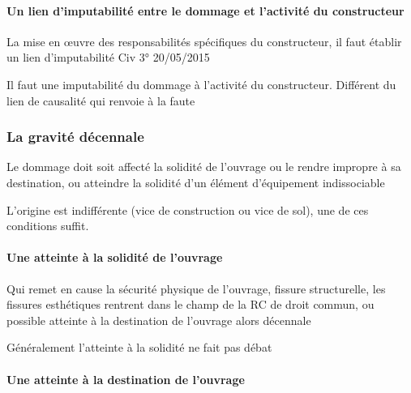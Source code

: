 			\paragraph{Un lien d'imputabilité entre le dommage et l'activité du constructeur}

			La mise en œuvre des responsabilités spécifiques du constructeur, il faut établir un lien d’imputabilité Civ 3°  20/05/2015

			Il faut une imputabilité du dommage à l’activité du constructeur. Différent du lien de causalité qui renvoie à la faute


		\subsubsection{La gravité décennale}\label{graviteDecennale}

		Le dommage doit soit affecté la solidité de l’ouvrage ou le rendre impropre à sa destination, ou atteindre la solidité d’un élément d’équipement indissociable

		L’origine est indifférente (vice de construction ou vice de sol), une de ces conditions suffit.


			\paragraph{Une atteinte à la solidité de l'ouvrage}

			Qui remet en cause la sécurité physique de l’ouvrage, fissure structurelle, les fissures esthétiques rentrent dans le champ de la RC de droit commun, ou possible atteinte à la destination de l’ouvrage alors décennale

			Généralement l’atteinte à la solidité ne fait pas débat


			\paragraph{Une atteinte à la destination de l'ouvrage}

